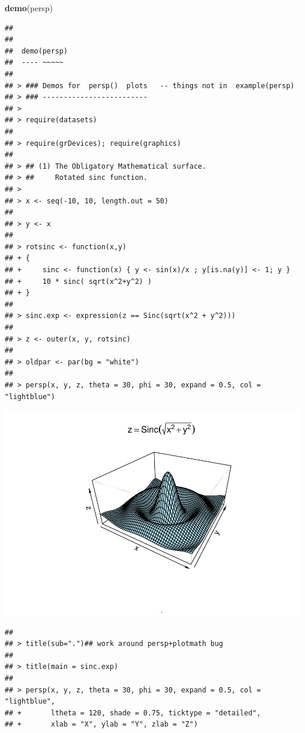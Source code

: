 \documentclass[
]{book}
\newenvironment{Shaded}{\begin{snugshade}}{\end{snugshade}}
\newcommand{\KeywordTok}[1]{\textcolor[rgb]{0.13,0.29,0.53}{\textbf{#1}}}
\newcommand{\NormalTok}[1]{#1}
\begin{document}
\begin{Shaded}
\begin{Highlighting}[]
\KeywordTok{demo}\NormalTok{(persp)}
\end{Highlighting}
\end{Shaded}

\begin{verbatim}
## 
## 
##  demo(persp)
##  ---- ~~~~~
## 
## > ### Demos for  persp()  plots   -- things not in  example(persp)
## > ### -------------------------
## > 
## > require(datasets)
## 
## > require(grDevices); require(graphics)
## 
## > ## (1) The Obligatory Mathematical surface.
## > ##     Rotated sinc function.
## > 
## > x <- seq(-10, 10, length.out = 50)
## 
## > y <- x
## 
## > rotsinc <- function(x,y)
## + {
## +     sinc <- function(x) { y <- sin(x)/x ; y[is.na(y)] <- 1; y }
## +     10 * sinc( sqrt(x^2+y^2) )
## + }
## 
## > sinc.exp <- expression(z == Sinc(sqrt(x^2 + y^2)))
## 
## > z <- outer(x, y, rotsinc)
## 
## > oldpar <- par(bg = "white")
## 
## > persp(x, y, z, theta = 30, phi = 30, expand = 0.5, col = "lightblue")
\end{verbatim}

\includegraphics{TudodoR_files/figure-latex/unnamed-chunk-146-1.pdf}

\begin{verbatim}
## 
## > title(sub=".")## work around persp+plotmath bug
## 
## > title(main = sinc.exp)
## 
## > persp(x, y, z, theta = 30, phi = 30, expand = 0.5, col = "lightblue",
## +       ltheta = 120, shade = 0.75, ticktype = "detailed",
## +       xlab = "X", ylab = "Y", zlab = "Z")
\end{verbatim}
\end{document}
